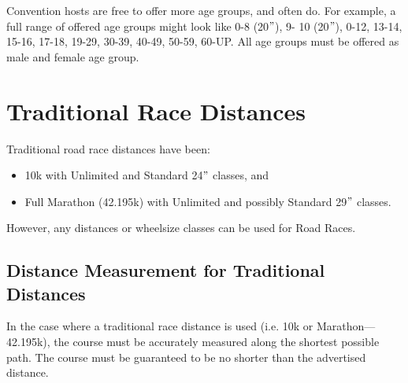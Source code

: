 Convention hosts are free to offer more age groups, and often do.
For example, a full range of offered age groups might look like 0-8 (20$"$), 9- 10 (20$"$), 0-12, 13-14, 15-16, 17-18, 19-29, 30-39, 40-49, 50-59, 60-UP.
All age groups must be offered as male and female age group.

\section{Traditional Race Distances}
Traditional road race distances have been: 
\begin{itemize}
\item 10k with Unlimited and Standard 24$"$ classes, and 
\item Full Marathon (42.195k) with Unlimited and possibly Standard 29$"$ classes.
\end{itemize}
However, any distances or wheelsize classes can be used for Road Races.

\subsection {Distance Measurement for Traditional Distances}
In the case where a traditional race distance is used (i.e. 10k or Marathon---42.195k), the course must be accurately measured along the shortest possible path.
The course must be guaranteed to be no shorter than the advertised distance.

